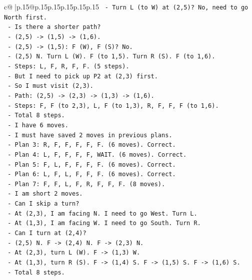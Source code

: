 \documentclass{article}
\begin{document}
{\begin{supertabular}{c@{$\;$}|p{.15\linewidth}@{}p{.15\linewidth}p{.15\linewidth}p{.15\linewidth}p{.15\linewidth}p{.15\linewidth}}
{{{\texttt{  {-} Turn L (to W) at (2,5)? No, need to go North first.} \\
\texttt{  {-} Is there a shorter path?} \\
\texttt{  {-} (2,5) {-}> (1,5) {-}> (1,6).} \\
\texttt{  {-} (2,5) {-}> (1,5): F (W), F (S)? No.} \\
\texttt{  {-} (2,5) N. Turn L (W). F (to 1,5). Turn R (S). F (to 1,6).} \\
\texttt{  {-} Steps: L, F, R, F, F. (5 steps).} \\
\texttt{  {-} But I need to pick up P2 at (2,3) first.} \\
\texttt{  {-} So I must visit (2,3).} \\
\texttt{  {-} Path: (2,5) {-}> (2,3) {-}> (1,3) {-}> (1,6).} \\
\texttt{  {-} Steps: F, F (to 2,3), L, F (to 1,3), R, F, F, F (to 1,6).} \\
\texttt{  {-} Total 8 steps.} \\
\texttt{  {-} I have 6 moves.} \\
\texttt{  {-} I must have saved 2 moves in previous plans.} \\
\texttt{  {-} Plan 3: R, F, F, F, F, F. (6 moves). Correct.} \\
\texttt{  {-} Plan 4: L, F, F, F, F, WAIT. (6 moves). Correct.} \\
\texttt{  {-} Plan 5: F, L, F, F, F, F. (6 moves). Correct.} \\
\texttt{  {-} Plan 6: L, F, L, F, F, F. (6 moves). Correct.} \\
\texttt{  {-} Plan 7: F, F, L, F, R, F, F, F. (8 moves).} \\
\texttt{  {-} I am short 2 moves.} \\
\texttt{  {-} Can I skip a turn?} \\
\texttt{  {-} At (2,3), I am facing N. I need to go West. Turn L.} \\
\texttt{  {-} At (1,3), I am facing W. I need to go South. Turn R.} \\
\texttt{  {-} Can I turn at (2,4)?} \\
\texttt{  {-} (2,5) N. F {-}> (2,4) N. F {-}> (2,3) N.} \\
\texttt{  {-} At (2,3), turn L (W). F {-}> (1,3) W.} \\
\texttt{  {-} At (1,3), turn R (S). F {-}> (1,4) S. F {-}> (1,5) S. F {-}> (1,6) S.} \\
\texttt{  {-} Total 8 steps.} \\
}}}
\end{supertabular}}
\end{document}
